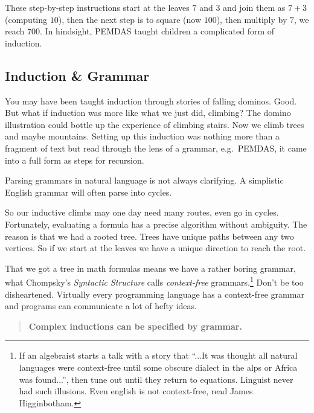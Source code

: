These step-by-step instructions start at the leaves $7$ and $3$ and join them as $7+3$ (computing $10$),
then the next step is to square (now $100$), then multiply by $7$, we reach $700$.
In hindsight, PEMDAS taught children a complicated form of induction.

\subsection{Induction \& Grammar}
You may have been taught induction through stories of falling 
dominos.  Good.  But what if induction was more like what we just did, climbing?
The domino illustration could bottle up the experience of climbing stairs.  
Now we climb trees and maybe mountains.
Setting up this induction was nothing more than a fragment of text but 
read through the lens of a grammar, e.g.\ PEMDAS, it came into a full form
as steps for recursion.

Parsing grammars in natural language is not always clarifying.  A simplistic
English grammar will often parse into cycles.
\begin{center}
\end{center}
So our inductive climbs may one day need many routes, even go in cycles.
Fortunately, evaluating a formula has a precise algorithm without ambiguity. The
reason is that we had a rooted tree.  Trees have unique paths between any two
vertices. So if we start at the leaves we have a unique direction to reach the
root. 



That we got a tree in math formulas means we have a rather boring grammar, 
what Chompsky's \emph{Syntactic Structure} calls
\emph{context-free} grammars.\footnote{
    If an algebraist starts a talk with a story that ``...It was thought  all natural 
    languages were context-free until some obscure dialect in the alps or Africa was found...'', 
    then tune out until they return to equations.  
    Linguist never had such illusions. Even english is not context-free, read  James Higginbotham.} 
Don't be too disheartened.  Virtually every programming language has a 
context-free grammar and programs can communicate a lot of hefty ideas. 

\begin{quote}
    \textbf{Complex inductions can be specified by grammar.}
\end{quote}
